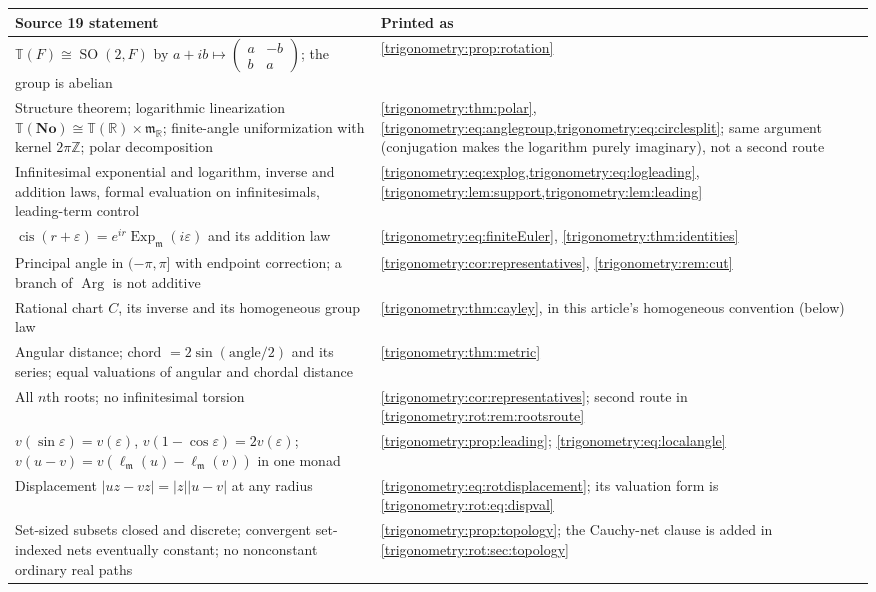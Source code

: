 \documentclass[11pt,letterpaper]{article}
\numberwithin{equation}{section}
\theoremstyle{definition}
\theoremstyle{remark}
\newcommand{\No}{\mathbf{No}}
\newcommand{\R}{\mathbb R}
\newcommand{\Z}{\mathbb Z}
\newcommand{\mm}{\mathfrak m}
\newcommand{\TT}{\mathbb T}
\newcommand{\eps}{\varepsilon}
\newcommand{\cis}{\operatorname{cis}}
\newcommand{\Arg}{\operatorname{Arg}}
\newcommand{\Ex}{\operatorname{Exp}_{\mm}}
\newcommand{\SO}{\operatorname{SO}}
\newcommand{\ellm}{\ell_{\mm}}
\begin{document}
\begin{center}\small
\begin{longtable}{L{0.47\textwidth}L{0.45\textwidth}}
\toprule
Source 19 statement & Printed as\\
\midrule\endhead
$\TT(F)\cong\SO(2,F)$ by $a+ib\mapsto\left(\begin{smallmatrix}a&-b\\b&a\end{smallmatrix}\right)$; the group is abelian & \cref{trigonometry:prop:rotation}\\
Structure theorem; logarithmic linearization $\TT(\No)\cong\TT(\R)\times\mm_{\R}$; finite-angle uniformization with kernel $2\pi\Z$; polar decomposition & \cref{trigonometry:thm:polar}, \cref{trigonometry:eq:anglegroup,trigonometry:eq:circlesplit}; same argument (conjugation makes the logarithm purely imaginary), not a second route\\
Infinitesimal exponential and logarithm, inverse and addition laws, formal evaluation on infinitesimals, leading-term control & \cref{trigonometry:eq:explog,trigonometry:eq:logleading}, \cref{trigonometry:lem:support,trigonometry:lem:leading}\\
$\cis(r+\eps)=e^{ir}\Ex(i\eps)$ and its addition law & \cref{trigonometry:eq:finiteEuler}, \cref{trigonometry:thm:identities}\\
Principal angle in $(-\pi,\pi]$ with endpoint correction; a branch of $\Arg$ is not additive & \cref{trigonometry:cor:representatives}, \cref{trigonometry:rem:cut}\\
Rational chart $C$, its inverse and its homogeneous group law & \cref{trigonometry:thm:cayley}, in this article's homogeneous convention (below)\\
Angular distance; chord $=2\sin(\text{angle}/2)$ and its series; equal valuations of angular and chordal distance & \cref{trigonometry:thm:metric}\\
All $n$th roots; no infinitesimal torsion & \cref{trigonometry:cor:representatives}; second route in \cref{trigonometry:rot:rem:rootsroute}\\
$v(\sin\eps)=v(\eps)$, $v(1-\cos\eps)=2v(\eps)$; $v(u-v)=v(\ellm(u)-\ellm(v))$ in one monad & \cref{trigonometry:prop:leading}; \cref{trigonometry:eq:localangle}\\
Displacement $|uz-vz|=|z||u-v|$ at any radius & \cref{trigonometry:eq:rotdisplacement}; its valuation form is \cref{trigonometry:rot:eq:dispval}\\
Set-sized subsets closed and discrete; convergent set-indexed nets eventually constant; no nonconstant ordinary real paths & \cref{trigonometry:prop:topology}; the Cauchy-net clause is added in \cref{trigonometry:rot:sec:topology}\\

\end{longtable}
\end{center}
\end{document}
